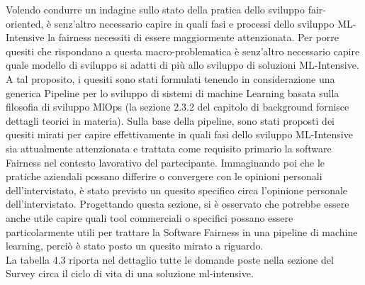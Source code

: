    Volendo condurre un indagine sullo stato della pratica dello sviluppo fair-oriented, è senz'altro necessario capire in quali fasi e processi dello sviluppo ML-Intensive la fairness necessiti di essere maggiormente attenzionata. Per porre quesiti che rispondano a questa macro-problematica è senz'altro necessario capire quale modello di sviluppo si adatti di più allo sviluppo di soluzioni ML-Intensive. A tal proposito, i quesiti sono stati formulati tenendo in considerazione una generica Pipeline per lo sviluppo di sistemi di machine Learning basata sulla filosofia di sviluppo MlOps (la sezione 2.3.2 del capitolo di background fornisce dettagli teorici in materia). Sulla base della pipeline, sono stati proposti dei quesiti mirati per capire effettivamente in quali fasi dello sviluppo ML-Intensive sia attualmente attenzionata e trattata come requisito primario la software Fairness nel contesto lavorativo del partecipante. Immaginando poi che le pratiche aziendali possano differire o convergere con le opinioni personali dell'intervistato, è stato previsto un quesito specifico circa l'opinione personale dell'intervistato. Progettando questa sezione, si è osservato che potrebbe essere anche utile capire quali tool commerciali o specifici possano essere particolarmente utili per trattare la Software Fairness in una pipeline di machine learning, perciò è stato posto un quesito mirato a riguardo. \\
   
   La tabella 4.3 riporta nel dettaglio tutte le domande poste nella sezione del Survey circa il ciclo di vita di una soluzione ml-intensive.
   
